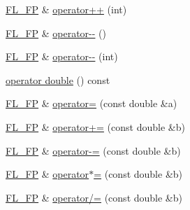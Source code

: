 \begin{DoxyCompactItemize}
\item 
\hyperlink{class_f_l___f_p}{F\+L\+\_\+\+FP} \& \hyperlink{class_f_l___f_p_ab8417e45b7fe2aeb0517834c0cec409c}{operator++} (int)
\item 
\hyperlink{class_f_l___f_p}{F\+L\+\_\+\+FP} \& \hyperlink{class_f_l___f_p_a3e9f6cc369b21fe2d188ebeca60a3df4}{operator-\/-\/} ()
\item 
\hyperlink{class_f_l___f_p}{F\+L\+\_\+\+FP} \& \hyperlink{class_f_l___f_p_a1a15cf670b1b9a8e66d6ba910bcb8e62}{operator-\/-\/} (int)
\item 
\hyperlink{class_f_l___f_p_af0526310d4b3754485f712b5dfb96b32}{operator double} () const
\item 
\hyperlink{class_f_l___f_p}{F\+L\+\_\+\+FP} \& \hyperlink{class_f_l___f_p_a676730a35c5b8e87c672336a34fa684d}{operator=} (const double \&a)
\item 
\hyperlink{class_f_l___f_p}{F\+L\+\_\+\+FP} \& \hyperlink{class_f_l___f_p_a858ea714be8344937bf2a1b78ff64b55}{operator+=} (const double \&b)
\item 
\hyperlink{class_f_l___f_p}{F\+L\+\_\+\+FP} \& \hyperlink{class_f_l___f_p_a43876e6b2d9ce28d6c230e75dfbe8cd5}{operator-\/=} (const double \&b)
\item 
\hyperlink{class_f_l___f_p}{F\+L\+\_\+\+FP} \& \hyperlink{class_f_l___f_p_aa5786b1ca47a70a1c61c0da74bfc5036}{operator$\ast$=} (const double \&b)
\item 
\hyperlink{class_f_l___f_p}{F\+L\+\_\+\+FP} \& \hyperlink{class_f_l___f_p_ab49fcbb06bdc25f29cc238f4c21c722d}{operator/=} (const double \&b)
\end{DoxyCompactItemize}

